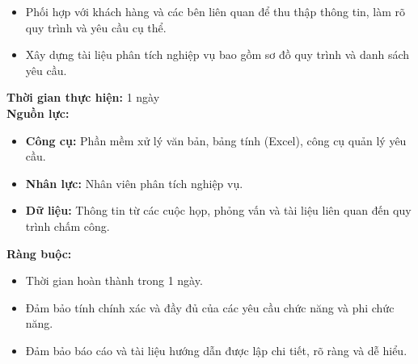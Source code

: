 {\begin{minipage}{\textwidth}
\begin{itemize}
        \item Phối hợp với khách hàng và các bên liên quan để thu thập thông tin, làm rõ quy trình và yêu cầu cụ thể.
        \item Xây dựng tài liệu phân tích nghiệp vụ bao gồm sơ đồ quy trình và danh sách yêu cầu.
    \end{itemize}
    \vspace{0.5cm}
    \noindent \textbf{Thời gian thực hiện:} 1 ngày \\
    \noindent \textbf{Nguồn lực:}
    \begin{itemize}
        \item \textbf{Công cụ:} Phần mềm xử lý văn bản, bảng tính (Excel), công cụ quản lý yêu cầu.
        \item \textbf{Nhân lực:} Nhân viên phân tích nghiệp vụ.
        \item \textbf{Dữ liệu:} Thông tin từ các cuộc họp, phỏng vấn và tài liệu liên quan đến quy trình chấm công.
    \end{itemize}
    \vspace{0.5cm}
    \noindent \textbf{Ràng buộc:}
    \begin{itemize}
        \item Thời gian hoàn thành trong 1 ngày.
        \item Đảm bảo tính chính xác và đầy đủ của các yêu cầu chức năng và phi chức năng.
        \item Đảm bảo báo cáo và tài liệu hướng dẫn được lập chi tiết, rõ ràng và dễ hiểu.
    \end{itemize}
    \end{minipage}
}

\newpage %

% 
